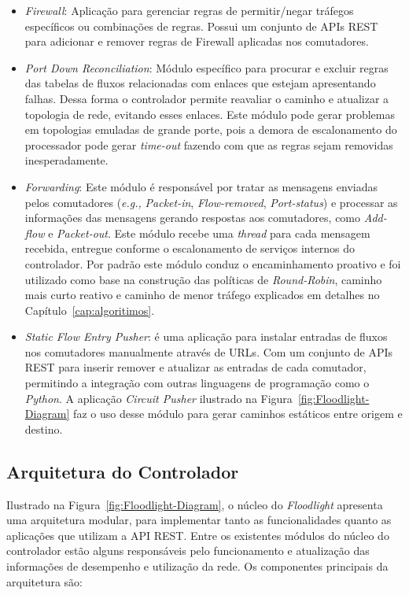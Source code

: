 \begin{itemize}
\item \textit{Firewall}: Aplicação para gerenciar regras de permitir/negar tráfegos específicos ou combinações de regras. Possui um conjunto de APIs REST para adicionar e remover regras de Firewall aplicadas nos comutadores.
\item \textit{Port Down Reconciliation}: Módulo específico para procurar e excluir regras das tabelas de fluxos relacionadas com enlaces que estejam apresentando falhas. Dessa forma o controlador permite reavaliar o caminho e atualizar a topologia de rede, evitando esses enlaces. Este módulo pode gerar problemas em topologias emuladas de grande porte, pois a demora de escalonamento do processador pode gerar \textit{time-out} fazendo com que as regras sejam removidas inesperadamente.
\item \textit{Forwarding}: Este módulo é responsável por tratar as mensagens enviadas pelos comutadores (\textit{e.g.,} \textit{Packet-in}, \textit{Flow-removed}, \textit{Port-status}) e processar as informações das mensagens gerando respostas aos comutadores, como \textit{Add-flow} e \textit{Packet-out}. Este módulo recebe uma \textit{thread} para cada mensagem recebida, entregue conforme o escalonamento de serviços internos do controlador. Por padrão este módulo conduz o encaminhamento proativo e foi utilizado como base na construção das políticas de \textit{Round-Robin}, caminho mais curto reativo e caminho de menor tráfego explicados em detalhes no Capítulo~\ref{cap:algoritimos}. 

\item \textit{Static Flow Entry Pusher}: é uma aplicação para instalar entradas de fluxos nos comutadores manualmente através de URLs. Com um conjunto de APIs REST para inserir remover e atualizar as entradas de cada comutador, permitindo a integração com outras linguagens de programação como o \textit{Python}. A aplicação \textit{Circuit Pusher} ilustrado na Figura~\ref{fig:Floodlight-Diagram} faz o uso desse módulo para gerar caminhos estáticos entre origem e destino.
\end{itemize} 

\subsection{Arquitetura do Controlador} 
\label{sub:arquiteturaflood}
Ilustrado na Figura~\ref{fig:Floodlight-Diagram}, o núcleo do \textit{Floodlight} apresenta uma arquitetura modular, para implementar tanto as funcionalidades quanto as aplicações que utilizam a API REST. Entre os existentes módulos do núcleo do controlador estão alguns responsáveis pelo funcionamento e atualização das informações de desempenho e utilização da rede.
Os componentes principais da arquitetura são:

